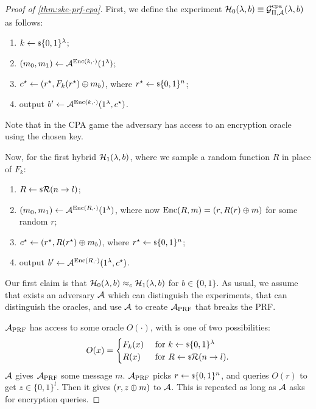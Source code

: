 \begin{proof}[Proof of \cref{thm:ske-prf-cpa}]
	First, we define the experiment $\mathcal{H}_0(\lambda, b) \equiv \mathcal{G}^{\scriptstyle \text{cpa}}_{\Pi,\mathcal{A}}(\lambda, b)$ as follows:
	\begin{enumerate}
		\item $k \leftarrow {\scriptstyle \$} {\{0,1\}^{\lambda}}$;
		\item $(m_0,m_1) \leftarrow \mathcal{A}^{\mathrm{Enc}(k, \cdot)} (1^{\lambda})$;
		\item $c^{\star} \leftarrow (r^{\star}, F_k(r^{\star}) \oplus m_b)$, where $r^{\star} \leftarrow {\scriptstyle \$} {\{0,1\}^{n}}$;
		\item output $b' \leftarrow \mathcal{A}^{\mathrm{Enc}(k, \cdot)} (1^{\lambda}, c^{\star})$.
	\end{enumerate}
	Note that in the \ac{CPA} game the adversary has access to an encryption oracle using the chosen key.

	Now, for the first hybrid $\mathcal{H}_1(\lambda, b)$, where we sample a random function $R$ in place of $F_k$:
	\begin{enumerate}
		\item $R \leftarrow {\scriptstyle \$} {\mathcal{R}(n \to l)}$;
		\item $(m_0,m_1) \leftarrow \mathcal{A}^{\mathrm{Enc}(R, \cdot)} (1^{\lambda})$, where now $\mathrm{Enc}(R, m) = (r, R(r) \oplus m)$ for some random $r$;
		\item $c^{\star} \leftarrow (r^{\star}, R(r^{\star}) \oplus m_b)$, where $r^{\star} \leftarrow {\scriptstyle \$} {\{0,1\}^{n}}$;
		\item output $b' \leftarrow \mathcal{A}^{\mathrm{Enc}(R, \cdot)} (1^{\lambda}, c^{\star})$.
	\end{enumerate}

	Our first claim is that $\mathcal{H}_0(\lambda, b) \approx_c \mathcal{H}_1(\lambda, b)$ for $b \in \{0,1\}$.
	As usual, we assume that exists an adversary $\mathcal{A}$ which can distinguish the experiments, \ie that can distinguish the oracles, and use $\mathcal{A}$ to create $\mathcal{A}_{\text{PRF}}$ that breaks the \ac{PRF}.

	$\mathcal{A}_{\text{PRF}}$ has access to some oracle $O(\cdot)$, with is one of two possibilities:
	\begin{equation*}
		O(x) =
		\begin{cases}
			F_k(x) & \text{ for } k \leftarrow {\scriptstyle \$} {\{0,1\}^{\lambda}} \\
			R(x) & \text{ for } R \leftarrow {\scriptstyle \$} {\mathcal{R}(n \to l)}.
		\end{cases}
	\end{equation*}
	$\mathcal{A}$ gives $\mathcal{A}_{\text{PRF}}$ some message $m$.
	$\mathcal{A}_{\text{PRF}}$ picks $r \leftarrow {\scriptstyle \$} {\{0,1\}^{n}}$, and queries $O(r)$ to get $z \in \{0,1\}^{l}$.
	Then it gives $(r, z \oplus m)$ to $\mathcal{A}$.
	This is repeated as long as $\mathcal{A}$ asks for encryption queries.


\end{proof}
